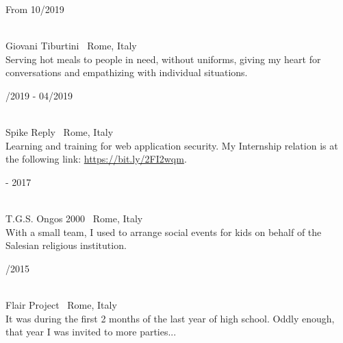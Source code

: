 \begin{minipage}{.3\textwidth}
	\flushright From 10/2019 \faCalendar
\end{minipage}
\hfill
\begin{minipage}{.65\textwidth}
	\vfill
	 \\
	\color{Maroon} Giovani Tiburtini \color{Sepia} \hfill \faMapMarker \ Rome, Italy
	\smallskip
	\\
	\color{gray} Serving hot meals to people in need, without uniforms, giving my heart for conversations and empathizing with individual situations.
	\vfill
\end{minipage}

\bigskip

\begin{minipage}{.3\textwidth}
	/2019 - 04/2019 \faCalendar
\end{minipage}
\hfill
\begin{minipage}{.65\textwidth}
	\vfill
	 \\
	\color{Maroon} Spike Reply \color{Sepia} \hfill \faMapMarker \ Rome, Italy
	\smallskip
	\\
	\color{gray} Learning and training for web application security. My Internship relation is at the following link: \url{https://bit.ly/2FI2wqm}.
	\vfill
\end{minipage}

\bigskip

\begin{minipage}{.3\textwidth}
	 - 2017 \faCalendar
\end{minipage}
\hfill
\begin{minipage}{.65\textwidth}
	\vfill
	 \\
	\color{Maroon} T.G.S. Ongos 2000 \color{Sepia} \hfill \faMapMarker \ Rome, Italy
	\smallskip
	\\
	\color{gray} With a small team, I used to arrange social events for kids on behalf of the Salesian religious institution. 
	\vfill
\end{minipage}

\bigskip

\begin{minipage}{.3\textwidth}
	/2015 \faCalendar
\end{minipage}
\hfill
\begin{minipage}{.65\textwidth}
	\vfill
	 \\
	\color{Maroon} Flair Project \color{Sepia} \hfill \faMapMarker \ Rome, Italy
	\smallskip
	\\
	\color{gray} It was during the first 2 months of the last year of high school. Oddly enough, that year I was invited to more parties...
	\vfill
\end{minipage}


